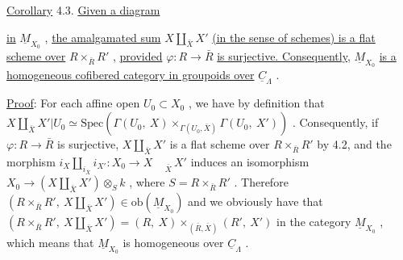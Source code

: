 \underline{Corollary} 4.3.  \underline{Given a diagram}

\begin{center}
\end{center}
\underline{in}  $\underline{M}_{X_0}$ , \underline{the amalgamated sum}  $X \underset{\bar{X}}{\amalg} X'$  \underline{(in the sense of schemes) is a flat scheme over}  $R \times_{\bar{R}} R'$ , \underline{provided}  $\varphi : R \to \bar{R}$  \underline{is surjective. Consequently,}  $\underline{M}_{X_0}$ \underline{is a homogeneous cofibered category in groupoids over}  $\underline{C}_\Lambda$ .

\underline{Proof}:  For each affine open  $U_0 \subset X_0$ , we have by definition that $X \underset{\bar{X}}{\amalg} X'|U_0 \simeq \mathrm{Spec}(\Gamma(U_0,\ X) \times_{\Gamma(U_0,\bar{X})} \Gamma(U_0,\ X'))$ . Consequently, if  $\varphi : R \to \bar{R}$ is surjective,  $X \underset{\bar{X}}{\amalg} X'$  is a flat scheme over  $R \times_{\bar{R}} R'$  by 4.2, and the morphism $i_X \underset{i_{\bar{X}}}{\amalg} i_{X'} : X_0 \to X \underset{\bar{X}}{\phantom{\amalg}} X'$  induces an isomorphism  $X_0 \to (X \underset{\bar{X}}{\amalg} X') \otimes_S k$ , where $S = R \times_{\bar{R}} R'$ . Therefore  $(R \times_{\bar{R}} R' ,\ X \underset{\bar{X}}{\amalg} X') \in \mathrm{ob}(\underline{M}_{X_0})$  and we obviously have that  $(R \times_{\bar{R}} R',\ X \underset{\bar{X}}{\amalg} X') = (R,\ X) \times_{(\bar{R},\bar{X})} (R',\ X')$  in the category  $\underline{M}_{X_0}$ , which
means that $\underline{M}_{X_0}$ is homogeneous over $\underline{C}_\Lambda$ .

